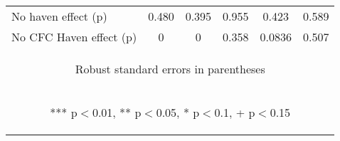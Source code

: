 \begin{center}
\begin{tabular}{lccccc}
No haven effect (p) & 0.480 & 0.395 & 0.955 & 0.423 & 0.589 \\
 No CFC Haven effect (p) & 0 & 0 & 0.358 & 0.0836 & 0.507 \\ \hline
\multicolumn{6}{c}{\begin{footnotesize} Robust standard errors in parentheses\end{footnotesize}} \\
\multicolumn{6}{c}{\begin{footnotesize} *** p$<$0.01, ** p$<$0.05, * p$<$0.1, + p$<$0.15\end{footnotesize}} \\
\end{tabular}
\end{center}
